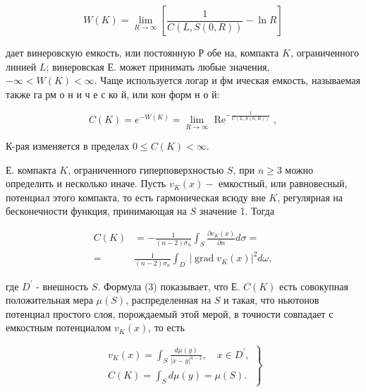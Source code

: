 \documentclass[10pt]{article}
\begin{document}
\[

W(K)=\lim _{R \rightarrow \infty}\left[\frac{1}{C(L, S(0, R))}-\ln R\right]

\]



дает винеровскую емкость, или постоянную Р обе на, компакта $K$, ограниченного линией $L$; винеровская Е. может принимать любые значения, $-\infty<W(K)<\infty$. Чаще используется логар и фм ическая емкость, называемая также га рм о н и ч е с ко й, или кон форм н о й:



\[

C(K)=e^{-W(K)}=\lim _{R \rightarrow \infty} \operatorname{Re}^{-\frac{1}{C(L, S(0, R))}},

\]



К-рая изменяется в пределах $0 \leqslant C(K)<\infty$.



Е. компакта $K$, ограниченного гиперповерхностью $S$, при $n \geqslant 3$ можно определить и несколько иначе. Пусть $v_{K}(x)-$ емкостный, или равновесный, потенциал этого компакта, то есть гармоническая всюду вне $K$, регулярная на бесконечности функция, принимающая на $S$ значение 1. Тогда



\[

\begin{aligned}

C(K) & =-\frac{1}{(n-2) \sigma_{n}} \int_{S} \frac{\partial v_{K}(x)}{\partial n} d \sigma= \\

= & \frac{1}{(n-2) \sigma_{n}} \int_{D^{\prime}}\left|\operatorname{grad} v_{K}(x)\right|^{2} d \omega,

\end{aligned}

\]



где $D^{\prime}$ - внешность $S$. Формула (3) показывает, что Е. $C(K)$ есть совокупная положительная мера $\mu(S)$, распределенная на $S$ и такая, что ньютонов потенциал простого слоя, порождаемый этой мерой, в точности совпадает с емкостным потенциалом $v_{K}(x)$, то есть



\[

\left.\begin{array}{l}

v_{K}(x)=\int_{S} \frac{d \mu(y)}{|x-y|^{n-2}}, \quad x \in D^{\prime}, \\

C(K)=\int_{S} d \mu(y)=\mu(S) .

\end{array}\right\}

\]
\end{document}
